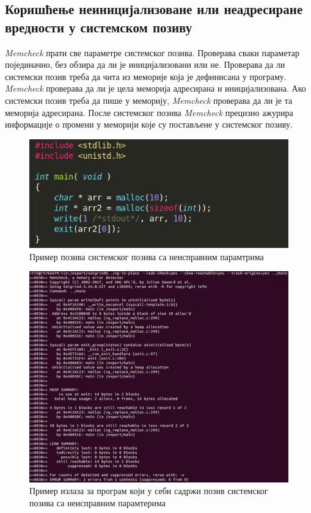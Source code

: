 \documentclass[12pt,oneside]{memoir}
\begin{document}
\subsection{Коришћење неиницијализоване или неадресиране вредности у системском позиву}

\indent \textit{Memcheck} прати све параметре системског позива.  Проверава сваки параметар појединачно, без обзира да ли је иницијализовани или не. Проверава да ли системски позив треба да чита из меморије која је дефинисана у програму. \textit{Memcheck} проверава да ли је цела меморија адресирана и иницијализована. Ако системски позив треба да пише у меморију, \textit{Memcheck} проверава да ли је та меморија адресирана. После системског позива \textit{Memcheck} прецизно ажурира информације о промени у меморији које су постављене у системског позиву.

\begin{figure}[h!]
\begin{center}
\includegraphics[scale=0.75]{slika3.png}
\end{center}
\caption{Пример позива системског позива са неисправним парамтрима}
\label{fig:main1}
\end{figure}



\begin{figure}[h!]
\begin{center}
\includegraphics[scale=0.75]{slika4.png}
\end{center}
\caption{Пример излаза за програм који у себи садржи позив системског позива са неисправним парамтерима}
\label{fig:memcheck1}
\end{figure}
\end{document}
